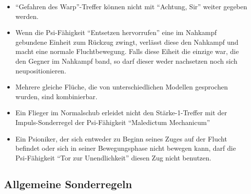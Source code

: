 \begin{itemize}

 \item ``Gefahren des Warp''-Treffer können nicht mit ``Achtung, Sir'' weiter
  gegeben werden.

 \item Wenn die Psi-Fähigkeit ``Entsetzen hervorrufen'' eine im Nahkampf gebundene
  Einheit zum Rückzug zwingt, verlässt diese den Nahkampf und macht eine normale
  Fluchtbewegung. Falls diese Eiheit die einzige war, die den Gegner im Nahkampf
  band, so darf dieser weder nachsetzen noch sich neupositionieren.

 \item Mehrere gleiche Flüche, die von unterschiedlichen Modellen gesprochen
  wurden, sind kombinierbar.

 \item Ein Flieger im Normalschub erleidet nicht den Stärke-1-Treffer mit der
  Impuls-Sonderregel der Psi-Fähigkeit ``Maledictum Mechanicum''

 \item Ein Psioniker, der sich entweder zu Beginn seines Zuges auf der Flucht
  befindet oder sich in seiner Bewegungsphase nicht bewegen kann, darf die
  Psi-Fähigkeit ``Tor zur Unendlichkeit'' diesen Zug nicht benutzen.

\end{itemize}

\subsection{Allgemeine Sonderregeln}

